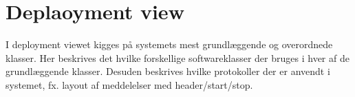 \section{Deplaoyment view}

I deployment viewet kigges på systemets mest grundlæggende og overordnede klasser. Her beskrives det hvilke forskellige softwareklasser der bruges i hver af de grundlæggende klasser. Desuden beskrives hvilke protokoller der er anvendt i systemet, fx. layout af meddelelser med header/start/stop.   

